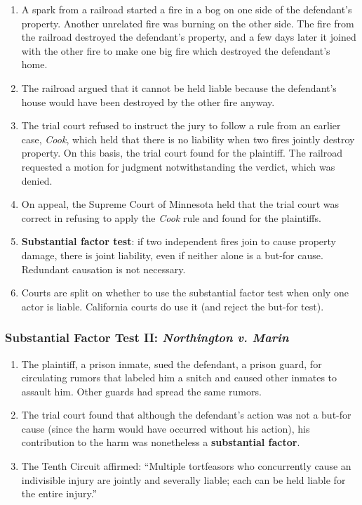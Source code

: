 \begin{enumerate}
    \item A spark from a railroad started a fire in a bog on one side of the 
    defendant's property. Another unrelated fire was burning on the other 
    side. The fire from the railroad destroyed the defendant's property, and a 
    few days later it joined with the other fire to make one big fire which 
    destroyed the defendant's home.
    \item The railroad argued that it cannot be held liable because the 
    defendant's house would have been destroyed by the other fire anyway.
    \item The trial court refused to instruct the jury to follow a rule from 
    an earlier case, \emph{Cook}, which held that there is no liability when 
    two fires jointly destroy property. On this basis, the trial court found 
    for the plaintiff. The railroad requested a motion for judgment 
    notwithstanding the verdict, which was denied.
    \item On appeal, the Supreme Court of Minnesota held that the 
    trial court was correct in refusing to apply the \emph{Cook} rule and 
    found for the plaintiffs.
    \item \textbf{Substantial factor test}: if two independent fires join to 
    cause property damage, there is joint liability, even if neither alone is 
    a but-for cause. Redundant causation is not necessary.
    \item Courts are split on whether to use the substantial factor test when 
    only one actor is liable. California courts do use it (and reject the 
    but-for test).
\end{enumerate}

\subsubsection{Substantial Factor Test II: \emph{Northington v. Marin}}

\begin{enumerate}
    \item The plaintiff, a prison inmate, sued the defendant, a prison guard, 
    for circulating rumors that labeled him a snitch and caused other inmates 
    to assault him. Other guards had spread the same rumors.
    \item The trial court found that although the defendant's action was not a 
    but-for cause (since the harm would have occurred without his action), his 
    contribution to the harm was nonetheless a \textbf{substantial factor}.
    \item The Tenth Circuit affirmed: ``Multiple tortfeasors who concurrently 
    cause an indivisible injury are jointly and severally liable; each can be 
    held liable for the entire injury.''
\end{enumerate}


